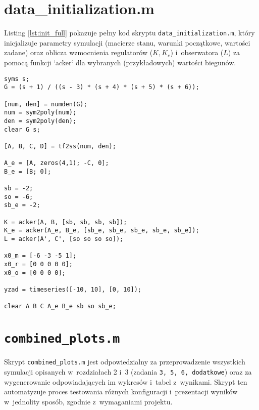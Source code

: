 \documentclass[a4paper,titlepage,11pt,floatssmall]{mwrep} %
\begin{document}
\section{data\_initialization.m}

Listing \ref{lst:init_full} pokazuje pełny kod skryptu \texttt{data\_initialization.m}, który inicjalizuje parametry symulacji (macierze stanu, warunki początkowe, wartości zadane) oraz oblicza wzmocnienia regulatorów ($K, K_e$) i~obserwatora ($L$) za pomocą funkcji `acker` dla wybranych (przykładowych) wartości biegunów.

\begin{lstlisting}[style=custommatlab, caption={Pełny kod skryptu \texttt{initializasja\_danych.m}.}, label={lst:init_full}]
syms s;
G = (s + 1) / ((s - 3) * (s + 4) * (s + 5) * (s + 6));

[num, den] = numden(G);
num = sym2poly(num);
den = sym2poly(den);
clear G s;

[A, B, C, D] = tf2ss(num, den);

A_e = [A, zeros(4,1); -C, 0];
B_e = [B; 0];

sb = -2;
so = -6;
sb_e = -2;

K = acker(A, B, [sb, sb, sb, sb]);
K_e = acker(A_e, B_e, [sb_e, sb_e, sb_e, sb_e, sb_e]);
L = acker(A', C', [so so so so]);

x0_m = [-6 -3 -5 1];
x0_r = [0 0 0 0 0];
x0_o = [0 0 0 0];

yzad = timeseries([-10, 10], [0, 10]);

clear A B C A_e B_e sb so sb_e;
\end{lstlisting}

\section{\texttt{combined\_plots.m}}

Skrypt \texttt{combined\_plots.m} jest odpowiedzialny za przeprowadzenie wszystkich symulacji opisanych w~rozdziałach 2 i~3 (zadania \texttt{3, 5, 6, dodatkowe}) oraz za wygenerowanie odpowiadających im wykresów i~tabel z~wynikami.
Skrypt ten automatyzuje proces testowania różnych konfiguracji i~prezentacji wyników w~jednolity sposób, zgodnie z~wymaganiami projektu.
\end{document}
